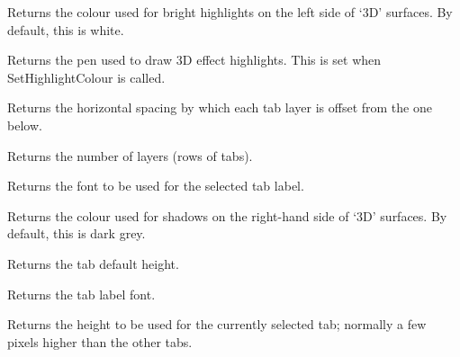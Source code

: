 

Returns the colour used for bright highlights on the left side of `3D' surfaces. By default, this is white.



Returns the pen used to draw 3D effect highlights. This is set when
SetHighlightColour is called. 



Returns the horizontal spacing by which each tab layer is offset from the one below.



Returns the number of layers (rows of tabs).



Returns the font to be used for the selected tab label.



Returns the colour used for shadows on the right-hand side of `3D' surfaces. By default, this is dark grey.



Returns the tab default height.



Returns the tab label font.



Returns the height to be used for the currently selected tab; normally a few pixels
higher than the other tabs.


